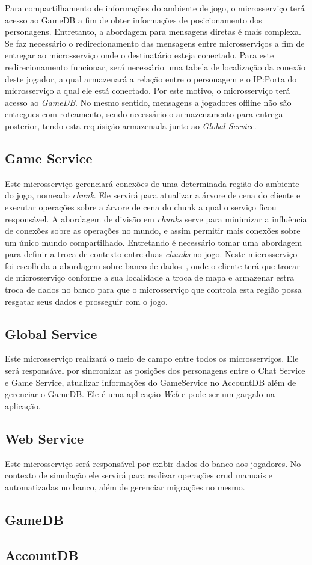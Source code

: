 Para compartilhamento de informações do ambiente de jogo, o microsserviço terá acesso ao GameDB a fim de obter informações de posicionamento dos personagens.
%
Entretanto, a abordagem para mensagens diretas é mais complexa.
%
Se faz necessário o redirecionamento das mensagens entre microsserviços a fim de entregar ao microsserviço onde o destinatário esteja conectado.
%
Para este redirecionamento funcionar, será necessário uma tabela de localização da conexão deste jogador, a qual armazenará a relação entre o personagem e o IP:Porta do microsserviço a qual ele está conectado.
%
Por este motivo, o microsserviço terá acesso ao \textit{GameDB}.
%
No mesmo sentido, mensagens a jogadores offline não são entregues com roteamento, sendo necessário o armazenamento para entrega posterior, tendo esta requisição armazenada junto ao \textit{Global Service}.



\subsection{Game Service}



Este microsserviço gerenciará conexões de uma determinada região do ambiente do jogo, nomeado \textit{chunk}.
%
Ele servirá para atualizar a árvore de cena do cliente e executar operações sobre a árvore de cena do chunk a qual o serviço ficou responsável.
%
A abordagem de divisão em \textit{chunks} serve para minimizar a influência de conexões sobre as operações no mundo, e assim permitir mais conexões sobre um único mundo compartilhado.
%
Entretando é necessário tomar uma abordagem para definir a troca de contexto entre duas \textit{chunks} no jogo.
%
Neste microsserviço foi escolhida a abordagem sobre banco de dados~\cite{albion_online_unite}, onde o cliente terá que trocar de microsserviço conforme a sua localidade a troca de mapa e armazenar estra troca de dados no banco para que o microsserviço que controla esta região possa resgatar seus dados e prosseguir com o jogo.



\subsection{Global Service}

Este microsserviço realizará o meio de campo entre todos os microsserviços.
%
Ele será responsável por sincronizar as posições dos personagens entre o Chat Service e Game Service, atualizar informações do GameService no AccountDB além de gerenciar o GameDB.
%
Ele é uma aplicação \textit{Web} e pode ser um gargalo na aplicação.

\subsection{Web Service}

Este microsserviço será responsável por exibir dados do banco aos jogadores.
%
No contexto de simulação ele servirá para realizar operações \ac{crud} manuais e automatizadas no banco, além de gerenciar migrações no mesmo.

\subsection{GameDB}

\subsection{AccountDB}
